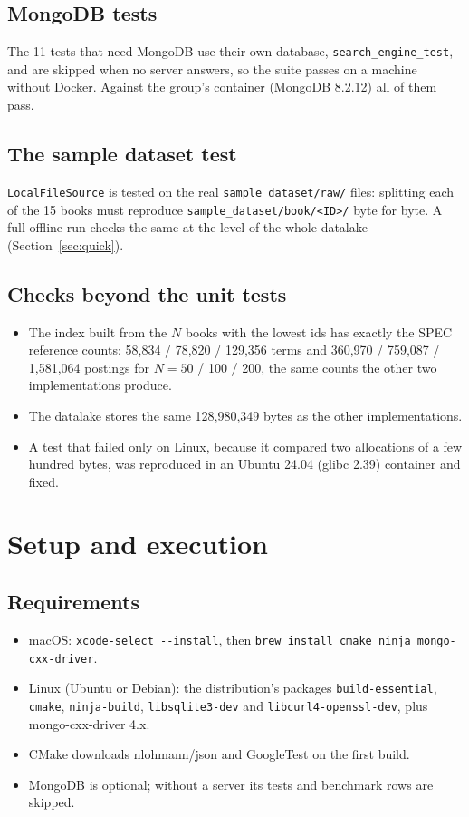 \documentclass[11pt,a4paper]{article}
\newcommand{\code}[1]{\texttt{#1}}
\begin{document}
\subsection{MongoDB tests}
The 11 tests that need MongoDB use their own database, \code{search\_engine\_test}, and are skipped
when no server answers, so the suite passes on a machine without Docker. Against the group's
container (MongoDB 8.2.12) all of them pass.

\subsection{The sample dataset test}
\code{LocalFileSource} is tested on the real \code{sample\_dataset/raw/} files: splitting each of the
15 books must reproduce \code{sample\_dataset/book/<ID>/} byte for byte. A full offline run checks the
same at the level of the whole datalake (Section~\ref{sec:quick}).

\subsection{Checks beyond the unit tests}
\begin{itemize}
  \item The index built from the $N$ books with the lowest ids has exactly the SPEC reference counts:
        58,834 / 78,820 / 129,356 terms and 360,970 / 759,087 / 1,581,064 postings for
        $N = 50$ / 100 / 200, the same counts the other two implementations produce.
  \item The datalake stores the same 128,980,349 bytes as the other implementations.
  \item A test that failed only on Linux, because it compared two allocations of a few hundred bytes,
        was reproduced in an Ubuntu 24.04 (glibc 2.39) container and fixed.
\end{itemize}

\section{Setup and execution}

\subsection{Requirements}
\begin{itemize}
  \item macOS: \code{xcode-select -{}-install}, then \code{brew install cmake ninja mongo-cxx-driver}.
  \item Linux (Ubuntu or Debian): the distribution's packages \code{build-essential}, \code{cmake},
        \code{ninja-build}, \code{libsqlite3-dev} and \code{libcurl4-openssl-dev}, plus
        mongo-cxx-driver 4.x.
  \item CMake downloads nlohmann/json and GoogleTest on the first build.
  \item MongoDB is optional; without a server its tests and benchmark rows are skipped.
\end{itemize}
\end{document}
